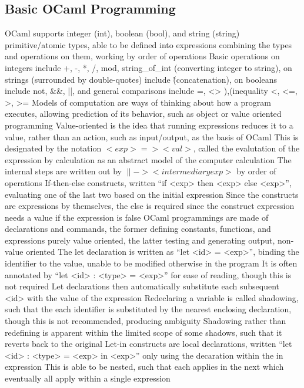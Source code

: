 \documentclass[11 pt, twoside]{article}
\newenvironment{outline*}
{
	\begin{outline}[enumerate]
	}
	{\end{outline}
}
\begin{document}
\subsection{Basic OCaml Programming}
\begin{outline*}
\1 OCaml supports integer (int), boolean (bool), and string (string) primitive/atomic types, able to be defined into expressions combining the types and operations on them, working by order of operations
\2 Basic operations on integers include +, -, *, /, mod, string\_of\_int (converting integer to string), on strings (surrounded by double-quotes) include \^ (concatenation), on booleans include not, \&\&, ||, and general comparisons include =, <> ),(inequality <, <=, >, >=
\1 Models of computation are ways of thinking about how a program executes, allowing prediction of its behavior, such as object or value oriented programming
\2 Value-oriented is the idea that running expressions reduces it to a value, rather than an action, such as input/output, as the basis of OCaml
\2 This is designated by the notation $<exp> => <val>$, called the evalutation of the expression by calculation as an abstract model of the computer calculation
\3 The internal steps are written out by $\|-> <intermediary exp>$ by order of operations
\1 If-then-else constructs, written ``if <exp> then <exp> else <exp>'', evaluating one of the last two based on the initial expression
\2 Since the constructs are expressions by themselves, the else is required since the construct expression needs a value if the expression is false
\1 OCaml programmings are made of declarations and commands, the former defining constants, functions, and expressions purely value oriented, the latter testing and generating output, non-value oriented
\2 The let declaration is written as ``let <id> = <exp>'', binding the identifier to the value, unable to be modified otherwise in the program
\3 It is often annotated by ``let <id> : <type> = <exp>'' for ease of reading, though this is not required
\3 Let declarations then automatically substitute each subsequent <id> with the value of the expression
\3 Redeclaring a variable is called shadowing, such that the each identifier is substituted by the nearest enclosing declaration, though this is not recommended, producing ambiguity
\4 Shadowing rather than redefining is apparent within the limited scope of some shadows, such that it reverts back to the original
\2 Let-in constructs are local declarations, written ``let <id> : <type> = <exp> in <exp>'' only using the decaration within the in expression
\3 This is able to be nested, such that each applies in the next which eventually all apply within a single expression

\end{outline*}
\end{document}
